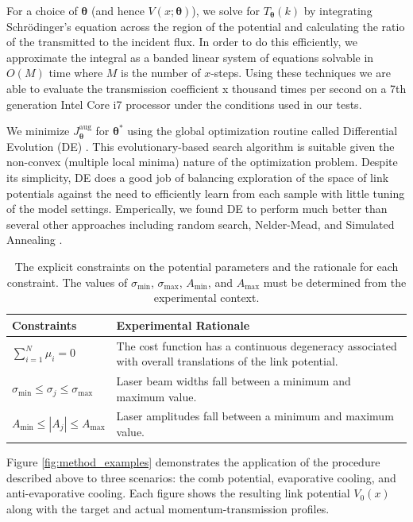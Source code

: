 \documentclass[twocolumn,amsmath,amssymb,showpacs,prl,superscriptaddress,aps]{revtex4-1}
\begin{document}
For a choice of $\bm{\theta}$ (and hence $V(x;\bm{\theta})$), we solve for $T_{\bm{\theta}}(k)$ by integrating Schr{\"o}dinger's equation across the region of the potential and calculating the ratio of the transmitted to the incident flux. In order to do this efficiently, we approximate the integral as a banded linear system of equations solvable in $O(M)$ time where $M$ is the number of $x$-steps. Using these techniques we are able to evaluate the transmission coefficient x thousand times per second on a 7th generation Intel Core i7 processor under the conditions used in our tests. 

 We minimize $J_{\bm{\theta}}^{\mathrm{aug}}$ for $\bm{\theta}^*$ using the global optimization routine called Differential Evolution (DE) \cite{original DE paper}. This evolutionary-based search algorithm is suitable given the non-convex (multiple local minima) nature of the optimization problem. Despite its simplicity, DE does a good job of balancing exploration of the space of link potentials against the need to efficiently learn from each sample with little tuning of the model settings. Emperically, we found DE to perform much better than several other approaches including random search, Nelder-Mead, and Simulated Annealing \cite{Tests performed using mathematica}.

\begin{table}[t]
  \renewcommand*{\arraystretch}{1.4}
  \begin{tabular}{m{3cm}|m{5.5cm}}
    Constraints & Experimental Rationale \\
    \hline\hline
    $\sum_{i=1}^{N}\mu_i = 0$ & The cost function has a continuous degeneracy associated with overall translations of the link potential. \\
    \hline
    $\sigma_{\mathrm{min}} \leq \sigma_j \leq \sigma_{\mathrm{max}} $ & Laser beam widths fall between a minimum and maximum value.\\
    \hline
    $A_{\mathrm{min}} \leq |A_j| \leq A_{\mathrm{max}}$ & Laser amplitudes fall between a minimum and maximum value.
  \end{tabular}
  \caption{The explicit constraints on the potential parameters and the rationale for each constraint. The values of $\sigma_{\mathrm{min}}$, $\sigma_{\mathrm{max}}$, $A_{\mathrm{min}}$, and $A_{\mathrm{max}}$ must be determined from the experimental context.}
  \label{tab:constraints}
\end{table}

Figure \ref{fig:method_examples} demonstrates the application of the procedure described above to three scenarios: the comb potential, evaporative cooling, and anti-evaporative cooling. Each figure shows the resulting link potential $V_0(x)$ along with the target and actual momentum-transmission profiles. 
\end{document}
